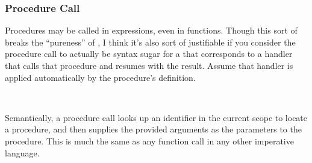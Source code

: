 \subsubsection{Procedure Call}

Procedures may be called in expressions, even in functions. Though this sort of
breaks the ``pureness'' of \Poetry{}, I think it's also sort of justifiable if you
consider the procedure call to actually be syntax sugar for a  that
corresponds to a handler that calls that procedure and resumes with the result.
Assume that handler is applied automatically by the procedure's definition.

\begin{bnf*}
     \\
\end{bnf*}

Semantically, a procedure call looks up an identifier in the current scope to
locate a procedure, and then supplies the provided arguments as the parameters
to the procedure. This is much the same as any function call in any other
imperative language.

\begin{prooftree}
\end{prooftree}
